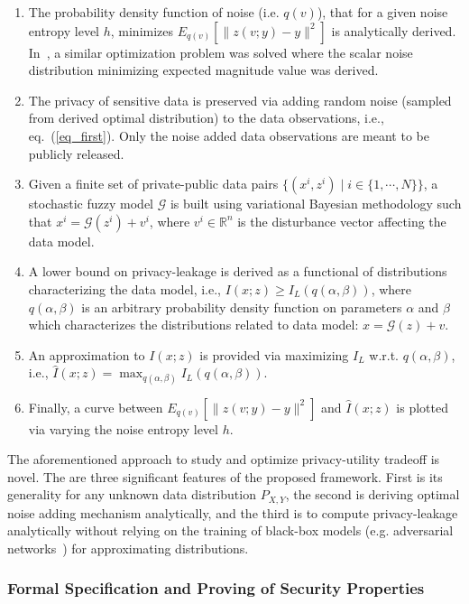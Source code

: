 \documentclass[a4paper,11pt]{article}
\begin{document}
\begin{enumerate}
\item The probability density function of noise (i.e. $q(v)$), that for a given noise entropy level $h$, minimizes $E_{q(v)}[\|z(v;y) - y \|^2 ]$ is analytically derived. In~\cite{10.1007/978-3-030-27684-3_15}, a similar optimization problem was solved where the scalar noise distribution minimizing expected magnitude value was derived.      
\item The privacy of sensitive data is preserved via adding random noise (sampled from derived optimal distribution) to the data observations, i.e., eq.~(\ref{eq_first}). Only the noise added data observations are meant to be publicly released.        
\item Given a finite set of private-public data pairs $\{(x^i,z^i)\;|\;i \in \{1,\cdots,N \} \}$, a stochastic fuzzy model $\mathcal{G}$ is built using variational Bayesian methodology such that $x^i = \mathcal{G}(z^i) + v^i$, where $v^i \in \mathbb{R}^n$ is the disturbance vector affecting the data model. 
\item A lower bound on privacy-leakage is derived as a functional of distributions characterizing the data model, i.e., $I(x;z) \geq I_L(q(\alpha,\beta))$, where $q(\alpha,\beta)$ is an arbitrary probability density function on parameters $\alpha$ and $\beta$ which characterizes the distributions related to data model: $x = \mathcal{G}(z) + v$.  
\item An approximation to $I(x;z)$ is provided via maximizing $I_L$ w.r.t. $q(\alpha,\beta)$, i.e., $\hat{I}(x;z) = \max_{q(\alpha,\beta)}I_L(q(\alpha,\beta))$. 
\item Finally, a curve between $E_{q(v)}[\|z(v;y) - y \|^2 ]$ and $\hat{I}(x;z)$ is plotted via varying the noise entropy level $h$.             
\end{enumerate} 
The aforementioned approach to study and optimize privacy-utility tradeoff is novel. The are three significant features of the proposed framework. First is its generality for any unknown data distribution $P_{X,Y}$, the second is deriving optimal noise adding mechanism analytically, and the third is to compute privacy-leakage analytically without relying on the training of black-box models (e.g. adversarial networks~\cite{8919758}) for approximating distributions. 



\subsubsection{Formal Specification and Proving of Security Properties}
\label{sect:formal}
\end{document}
